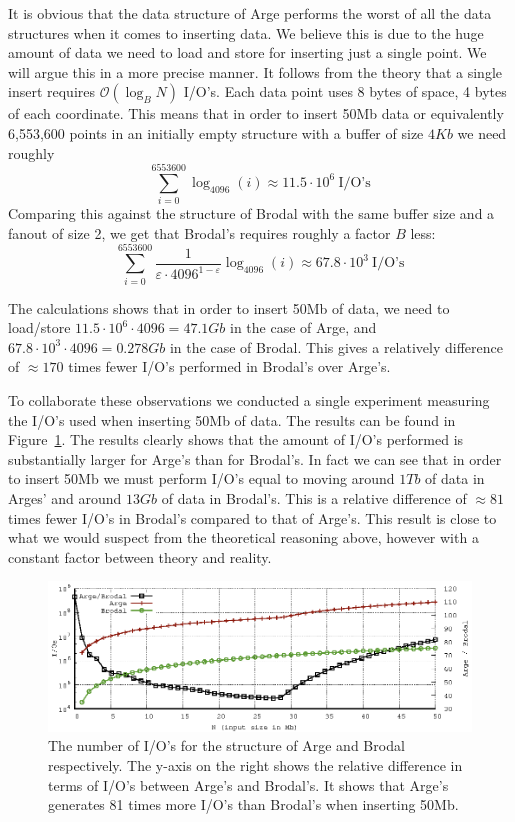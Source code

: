 \documentclass[twoside,11pt,openright]{report}
\def \epsilon {\varepsilon}
\begin{document}
It is obvious that the data structure of Arge performs the worst of all the data structures when it comes to inserting data. We believe this is due to the huge amount of data we need to load and store for inserting just a single point. We will argue this in a more precise manner. It follows from the theory that a single insert requires $\mathcal{O}(\log_B N)$ I/O's. Each data point uses 8 bytes of space, 4 bytes of each coordinate. This means that in order to insert 50Mb data or equivalently 6,553,600 points in an initially empty structure with a buffer of size $4Kb$ we need roughly $$\sum\limits_{i=0}^{6553600} \log_{4096}(i) \approx 11.5 \cdot 10^6~\text{I/O's}$$
Comparing this against the structure of Brodal with the same buffer size and a fanout of size 2, we get that Brodal's requires roughly a factor $B$ less:
$$\sum\limits_{i=0}^{6553600} \frac{1}{\epsilon \cdot 4096^{1-\epsilon}} \log_{4096}(i) \approx 67.8\cdot 10^3~\text{I/O's}$$

The calculations shows that in order to insert 50Mb of data, we need to load/store $11.5 \cdot 10^6 \cdot 4096 = 47.1Gb$ in the case of Arge, and $67.8\cdot 10^3 \cdot 4096 = 0.278Gb$ in the case of Brodal. This gives a relatively difference of $\approx 170$ times fewer I/O's performed in Brodal's over Arge's.

To collaborate these observations we conducted a single experiment measuring the I/O's used when inserting 50Mb of data. The results can be found in Figure~\ref{fig:arge_brodal_ios}. The results clearly shows that the amount of I/O's performed is substantially larger for Arge's than for Brodal's. In fact we can see that in order to insert 50Mb we must perform I/O's equal to moving around $1Tb$ of data in Arges' and around $13Gb$ of data in Brodal's. This is a relative difference of $\approx 81$ times fewer I/O's in Brodal's compared to that of Arge's. This result is close to what we would suspect from the theoretical reasoning above, however with a constant factor between theory and reality.

\begin{figure}[t]
\centering
\includegraphics[width=\textwidth]{../src/experiments/insert_experiment_results/2016-05-21.14_06_50/ios}
\caption{The number of I/O's for the structure of Arge and Brodal respectively. The y-axis on the right shows the relative difference in terms of I/O's between Arge's and Brodal's. It shows that Arge's generates 81 times more I/O's than Brodal's when inserting 50Mb.}
\label{fig:arge_brodal_ios}
\end{figure}
\end{document}
